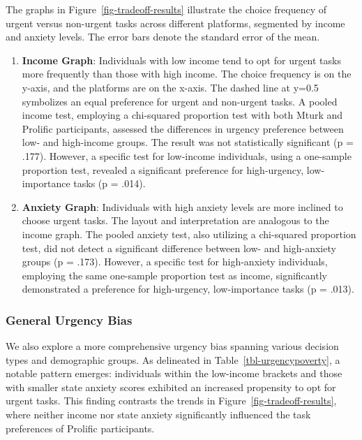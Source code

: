 \documentclass[
]{article}
\begin{document}
The graphs in Figure~\ref{fig-tradeoff-results} illustrate the choice
frequency of urgent versus non-urgent tasks across different platforms,
segmented by income and anxiety levels. The error bars denote the
standard error of the mean.

\begin{enumerate}
\def\labelenumi{\arabic{enumi}.}
\item
  \textbf{Income Graph}: Individuals with low income tend to opt for
  urgent tasks more frequently than those with high income. The choice
  frequency is on the y-axis, and the platforms are on the x-axis. The
  dashed line at y=0.5 symbolizes an equal preference for urgent and
  non-urgent tasks. A pooled income test, employing a chi-squared
  proportion test with both Mturk and Prolific participants, assessed
  the differences in urgency preference between low- and high-income
  groups. The result was not statistically significant (p = .177).
  However, a specific test for low-income individuals, using a
  one-sample proportion test, revealed a significant preference for
  high-urgency, low-importance tasks (p = .014).
\item
  \textbf{Anxiety Graph}: Individuals with high anxiety levels are more
  inclined to choose urgent tasks. The layout and interpretation are
  analogous to the income graph. The pooled anxiety test, also utilizing
  a chi-squared proportion test, did not detect a significant difference
  between low- and high-anxiety groups (p = .173). However, a specific
  test for high-anxiety individuals, employing the same one-sample
  proportion test as income, significantly demonstrated a preference for
  high-urgency, low-importance tasks (p = .013).
\end{enumerate}

\hypertarget{general-urgency-bias}{%
\subsubsection{General Urgency Bias}\label{general-urgency-bias}}

We also explore a more comprehensive urgency bias spanning various
decision types and demographic groups. As delineated in
Table~\ref{tbl-urgencypoverty}, a notable pattern emerges: individuals
within the low-income brackets and those with smaller state anxiety
scores exhibited an increased propensity to opt for urgent tasks. This
finding contrasts the trends in Figure~\ref{fig-tradeoff-results}, where
neither income nor state anxiety significantly influenced the task
preferences of Prolific participants.
\end{document}
